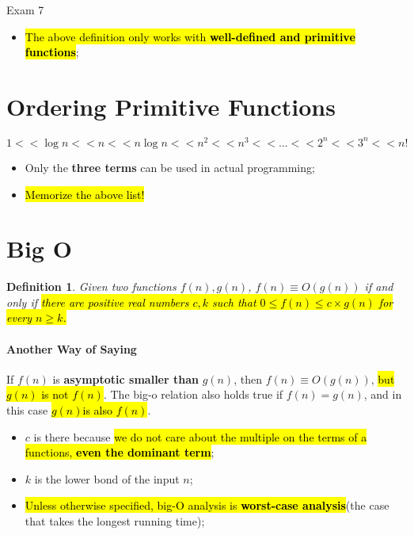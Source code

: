 \documentclass{note}
\newtheorem{definition}{Definition}
\begin{document}
\begin{note}{Exam 7}
\begin{itemize}
    \item \hl{The above definition only works with \textbf{well-defined and primitive functions}};
\end{itemize}

\section{Ordering Primitive Functions}

\begin{equation}\label{eq: ordering of pritmitive functions}
    1 << \log n << n << n \log n << n^{2} << n^{3} << ... << 2^{n} << 3^{n} << n!
\end{equation}

\begin{itemize}
    \item Only the \textbf{three terms} can be used in actual programming;
    \item \hl{Memorize the above list!}
\end{itemize}

\section{Big O}

\begin{definition}\label{def: big-o}
    Given two functions $ f(n), g(n) $, $ f(n) \equiv O\left( g(n) \right) $ if and only if
    \hl{there are positive real numbers $ c, k $ such that $ 0 \leq f(n) \leq c \times g(n) $ for every
    $ n \geq k $.}
\end{definition}

\paragraph{Another Way of Saying} If $ f(n) $ is \textbf{asymptotic smaller than} $ g(n) $,
then $ f(n) \equiv O\left( g(n) \right) $, \hl{but $ g(n) $ is not $ f(n) $}. The big-o relation also
holds true if $ f(n) = g(n) $, and in this case \hl{$ g(n) $is also $ f(n) $}.

\begin{itemize}
    \item $ c $ is there because \hl{we do not care about the multiple on the terms of a functions,
    \textbf{even the dominant term}};
    \item $ k $ is the lower bond of the input $ n $;

    \item \hl{Unless otherwise specified, big-O analysis is \textbf{worst-case analysis}}(the case that takes the longest
    running time);
\end{itemize}


\end{note}
\end{document}
